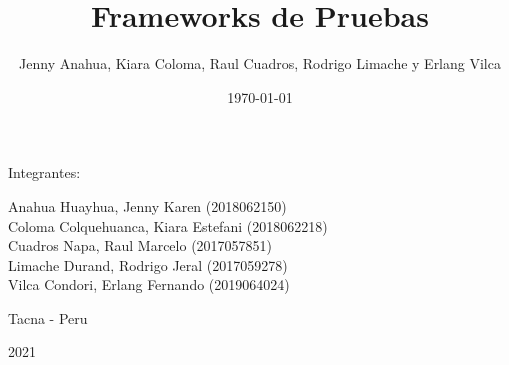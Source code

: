 \documentclass[twoside,twocolumn]{article}
\providecommand{\keywords}[1]
{
  \small	
  \textbf{\textit{Keywords---}} #1
}
\begin{document}
\begin{titlepage}
\begin{center}
\vspace*{0.2in}
\vspace*{0.1in}
\begin{large}
Integrantes: \\
\begin{flushleft}
Anahua Huayhua, Jenny Karen		\hfill	(2018062150) \\
Coloma Colquehuanca, Kiara Estefani		\hfill	(2018062218) \\
Cuadros Napa, Raul Marcelo         	\hfill	(2017057851) \\
Limache Durand, Rodrigo Jeral      	\hfill	(2017059278) \\
Vilca Condori, Erlang Fernando
\hfill	(2019064024) \\
\end{flushleft}
\end{large}
\vspace*{0.8in}
Tacna - Peru\end{center}
\begin{center}
2021\end{center}
\end{titlepage}
\setlength{\droptitle}{-4\baselineskip} %
\pretitle{\begin{center}\Huge\bfseries} %
\posttitle{\end{center}} %
\title{Frameworks de Pruebas} %
\author{Jenny Anahua, Kiara Coloma, Raul Cuadros, Rodrigo Limache y Erlang Vilca}
\date{\today} %
\renewcommand{\maketitlehookd}{%
\begin{large}
\centering Resumen\\
\end{large}
\vspace{0.5cm}
\noindent Un desarrollo de software contempla diferentes fases. Desde su planificación inicial, pasando por su desarrollo a su liberación oficial. Cada parte tiene su proceso, tiempos y costes y una de las que más tiempo llevan es la parte de testeo y resolución de errores. Por tanto,si estás pensando en la automatización como solución estás en el buen camino. Además, si estás pensando en crear tu propio marco de automatización de pruebas mejor es pensarlo dos veces pues en la mayoría de los casos es preferible considerar una o más de las opciones de código abierto disponibles.
\begin{abstract}
\noindent A software development contemplates different phases. From its initial planning, through its development to its official release. Each part has its own process, times and costs and one of the most time consuming is the testing and error resolution part. Therefore, if you are thinking of automation as a solution, you are on the right track. Also, if you are thinking of creating your own test automation framework, it is better to think twice, since in most cases it is preferable to consider one or more of the open source options available. 
\end{abstract}
\keywords{Frameworks, API testing, Pruebas de APIs, Software}
}
\end{document}
